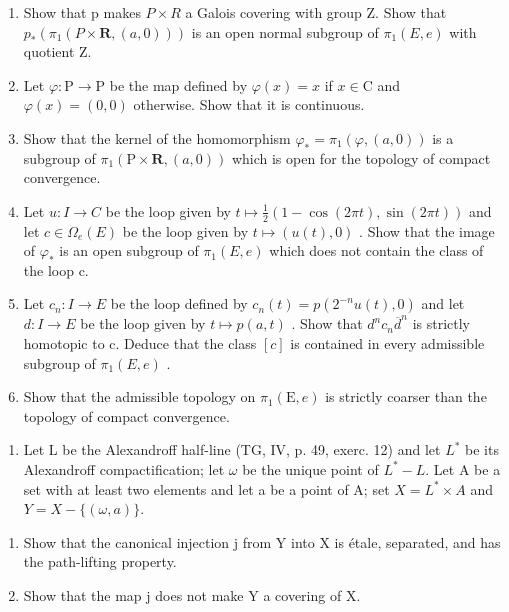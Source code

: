 \begin{enumerate}
\def\labelenumi{\alph{enumi})}
\item
  Show that p makes \(P \times R\) a Galois covering with group Z. Show that \(p_{*}(\pi_{1}(P \times \mathbf{R}, (a,0)))\) is an open normal subgroup of \(\pi_{1}(E, e)\) with quotient Z.
\item
  Let \(\varphi\colon\mathrm{P}\to\mathrm{P}\) be the map defined by \(\varphi(x)=x\) if \(x\in\mathrm{C}\) and \(\varphi(x)=(0,0)\) otherwise. Show that it is continuous.
\item
  Show that the kernel of the homomorphism \(\varphi_{*} = \pi_{1}(\varphi, (a,0))\) is a subgroup of \(\pi_{1}(\mathrm{P} \times \mathbf{R}, (a,0))\) which is open for the topology of compact convergence.
\item
  Let \(u: I \to C\) be the loop given by \(t \mapsto \frac{1}{2}(1 - \cos(2\pi t), \sin(2\pi t))\) and let \(c \in \Omega_e(E)\) be the loop given by \(t \mapsto (u(t), 0)\) . Show that the image of \(\varphi_*\) is an open subgroup of \(\pi_1(E, e)\) which does not contain the class of the loop c.
\item
  Let \(c_{n}: I \to E\) be the loop defined by \(c_{n}(t) = p(2^{-n}u(t), 0)\) and let \(d: I \to E\) be the loop given by \(t \mapsto p(a, t)\) . Show that \(d^{n}c_{n}\overline{d}^{n}\) is strictly homotopic to c. Deduce that the class \([c]\) is contained in every admissible subgroup of \(\pi_{1}(E, e)\) .
\item
  Show that the admissible topology on \(\pi_{1}(\mathrm{E},e)\) is strictly coarser than the topology of compact convergence.
\end{enumerate}

\begin{enumerate}
\def\labelenumi{\arabic{enumi})}
\setcounter{enumi}{3}
\tightlist
\item
  Let L be the Alexandroff half-line (TG, IV, p. 49, exerc. 12) and let \(L^{*}\) be its Alexandroff compactification; let \(\omega\) be the unique point of \(L^{*} - L\). Let A be a set with at least two elements and let a be a point of A; set \(X = L^{*} \times A\) and \(Y = X - \{(\omega, a)\}\).
\end{enumerate}

\begin{enumerate}
\def\labelenumi{\alph{enumi})}
\item
  Show that the canonical injection j from Y into X is étale, separated, and has the path-lifting property.
\item
  Show that the map j does not make Y a covering of X.
\end{enumerate}

